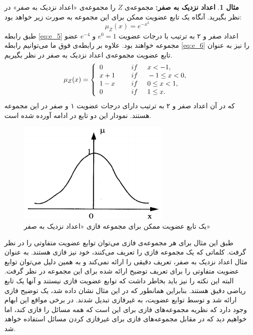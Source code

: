 \documentclass[12pt,a4paper]{article}
\theoremstyle{definition}
\newtheorem{exmp}{مثال}[section]
\begin{document}
\begin{exmp}\label{ex:e_2}
	\textbf{اعداد نزدیک به صفر:} مجموعه‌ی $Z$ را مجموعه‌ی «اعداد نزدیک به صفر» در نظر بگیرید. آنگاه یک تابع عضویت ممکن برای این مجموعه به صورت زیر خواهد بود:
	\begin{equation}\label{eq:e_5}
	\mu_{Z}(x)=e^{-x^2}
	\end{equation}
	طبق رابطه 
	\ref{eq:e_5}
	اعداد صفر و ۲ به ترتیب با درجات عضویت
	$e^0=1$ 
	و
	 $e^{-4}$
	 عضو مجموعه خواهند بود. علاوه بر رابطه‌ی فوق ما می‌توانیم رابطه 
	 \ref{eq:e_6}
	 را نیز به عنوان تابع عضویت مجموعه‌ی اعداد نزدیک به صفر در نظر بگیریم. 
	 \begin{equation}\label{eq:e_6}
	 	\mu_{Z}(x)=\left \{
	 \begin{array}{ll}
		0 \hskip 0.5cm & 	 if \hskip 0.5cm  x < -1,\\
		x+1 \hskip 0.5cm & 	if \hskip 0.5cm -1 \le x < 0,\\
		1-x \hskip 0.5cm & 	 if \hskip 0.5cm 0 \le x < 1,\\
		0 \hskip 0.5cm & 	 if \hskip 0.5cm 1 \le x.
	 \end{array}
	  \right.
	 \end{equation}
	که در آن اعداد صفر و ۲ به ترتیب دارای درجات عضویت ۱ و صفر در این مجموعه هستند. نمودار این  دو تابع در ادامه آورده شده است. 
	\begin{figure}[b]
		\centering 
		\includegraphics[width=75mm]{Images/Fig3.png}
		\vspace{-0.5cm}
		\caption{یک تابع عضویت ممکن برای مجموعه فازی «اعداد نزدیک به صفر»}\label{fig:f_3}
	\end{figure}
طبق این مثال برای هر مجموعه‌ی فازی می‌توان توابع عضویت متفاوتی را در نظر گرفت. کلماتی که یک مجموعه فازی را تعریف می‌کنند، خود نیز فازی هستند. به عنوان مثال اعداد نزدیک به صفر، تعریف دقیقی را ارائه نمی‌کند و به همین دلیل می‌توان توابع عضویت متفاوتی را برای تعریف توضیح ارائه شده برای این مجموعه در نظر گرفت. البته این نکته را نیز باید بخاطر داشت که توابع عضویت فازی نیستند و آنها یک تابع ریاضی دقیق هستند. 
 بنابراین همانطور که در این مثال نشان داده شد، یک توضیح فازی ارائه شد و توسط توابع عضویت، به غیرفازی  تبدیل شدند. در برخی مواقع این ابهام وجود دارد که نظریه مجموعه‌های فازی برای این است که همه مسائل را فازی کند، اما خواهیم دید که در مقابل مجموعه‌های فازی برای غیرفازی کردن مسائل استفاده خواهد شد.

\end{exmp}
\end{document}
